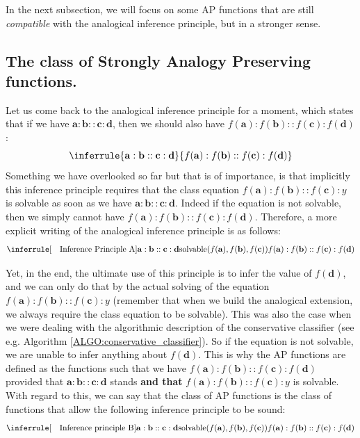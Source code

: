 In the next subsection, we will focus on some AP functions that are still
\textit{compatible} with the analogical inference principle, but in a stronger
sense.

\subsection{The class of Strongly Analogy Preserving functions.}
\label{SEC:the_class_of_SAP_functions}

Let us come back to the analogical inference principle for a moment, which
states that if we have  $\mathbf{a}: \mathbf{b}:: \mathbf{c}: \mathbf{d}$, then
we should also have $f(\mathbf{a}) :f(\mathbf{b}) :: f(\mathbf{c}) :
f(\mathbf{d})$:
$$
\inferrule{\mathbf{a} : \mathbf{b} :: \mathbf{c} : \mathbf{d}}{ f(\mathbf{a}) :
f(\mathbf{b}) :: f(\mathbf{c}) : f(\mathbf{d}) }
$$
Something we have overlooked so far but that is of importance, is that
implicitly this inference principle requires that the class equation
$f(\mathbf{a}) : f(\mathbf{b}) :: f(\mathbf{c}) : y$ is solvable as soon as we
have $\mathbf{a} : \mathbf{b} :: \mathbf{c} : \mathbf{d}$. Indeed if the
equation is not solvable, then we simply cannot have $f(\mathbf{a}) :
f(\mathbf{b}) :: f(\mathbf{c}) : f(\mathbf{d})$.
Therefore, a more explicit writing of the analogical inference principle is as
follows:
$$
\inferrule[\text{~~ Inference Principle A}]{\mathbf{a} : \mathbf{b} :: \mathbf{c} :
\mathbf{d}}{\solvable(f(\mathbf{a}), f(\mathbf{b}),
f(\mathbf{c})) \\\\f(\mathbf{a}) : f(\mathbf{b}) :: f(\mathbf{c}) :
f(\mathbf{d}) }
$$


Yet, in the end, the ultimate use of this principle is to infer the value of
$f(\mathbf{d})$, and we can only do that by the actual solving of the equation
$f(\mathbf{a}) : f(\mathbf{b}) :: f(\mathbf{c}) : y$ (remember that when we
build the analogical extension, we always require the class equation to be
solvable). This was also the case when we were dealing with the algorithmic
description of the conservative classifier (see e.g. Algorithm
\ref{ALGO:conservative_classifier}).  So if the equation is not
solvable, we are unable to infer anything about $f(\mathbf{d})$. This is why
the AP functions are defined as the functions such that we have $f(\mathbf{a})
:f(\mathbf{b}) :: f(\mathbf{c}) : f(\mathbf{d})$ provided that
$\mathbf{a}: \mathbf{b}:: \mathbf{c}: \mathbf{d}$ stands \textbf{and that}
$f(\mathbf{a}) :f(\mathbf{b}) :: f(\mathbf{c}) : y$ is solvable. With regard to
this, we can say that the class of AP functions is the class of functions that
allow the following inference principle to be sound: $$
\inferrule[\text{~~ Inference principle B}]{\mathbf{a} : \mathbf{b} ::
\mathbf{c} : \mathbf{d} \\\\ \solvable(f(\mathbf{a}), f(\mathbf{b}),
f(\mathbf{c}))}{f(\mathbf{a}) : f(\mathbf{b}) :: f(\mathbf{c}) : f(\mathbf{d})}
$$

